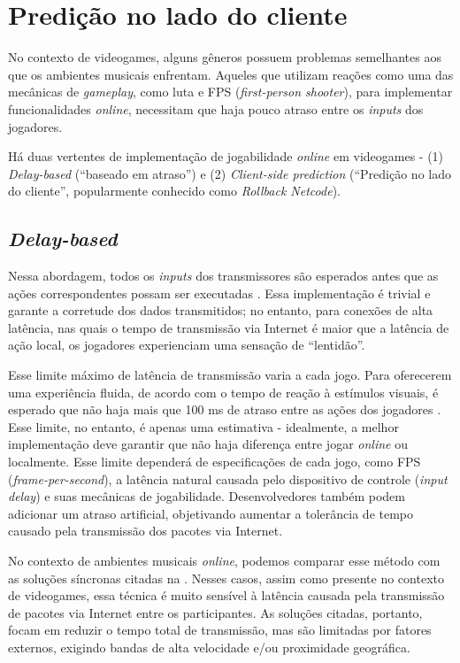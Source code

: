 \section{Predição no lado do cliente}
\label{sec:client_side_prediction}

No contexto de videogames, alguns gêneros possuem problemas semelhantes aos que os ambientes musicais enfrentam. Aqueles que utilizam reações como uma das mecânicas de \textit{gameplay}, como luta e FPS (\textit{first-person shooter}), para implementar funcionalidades \textit{online}, necessitam que haja pouco atraso entre os \textit{inputs} dos jogadores.

Há duas vertentes de implementação de jogabilidade \textit{online} em videogames - (1) \textit{Delay-based} (``baseado em atraso'')\cite{rollback} e (2) \textit{Client-side prediction} (``Predição no lado do cliente'', popularmente conhecido como \textit{Rollback Netcode})\cite{client-side-prediction}.

\subsection{\textit{Delay-based}}

Nessa abordagem, todos os \textit{inputs} dos transmissores são esperados antes que as ações correspondentes possam ser executadas \cite{rollback}. Essa implementação é trivial e garante a corretude dos dados transmitidos; no entanto, para conexões de alta latência, nas quais o tempo de transmissão via Internet é maior que a latência de ação local, os jogadores experienciam uma sensação de ``lentidão''.

Esse limite máximo de latência de transmissão varia a cada jogo. Para oferecerem uma experiência fluida, de acordo com o tempo de reação à estímulos visuais, é esperado que não haja mais que 100 ms de atraso entre as ações dos jogadores \cite{pubnub}. Esse limite, no entanto, é apenas uma estimativa - idealmente, a melhor implementação deve garantir que não haja diferença entre jogar \textit{online} ou localmente. Esse limite dependerá de especificações de cada jogo, como FPS (\textit{frame-per-second}), a latência natural causada pelo dispositivo de controle (\textit{input delay}) e suas mecânicas de jogabilidade. Desenvolvedores também podem adicionar um atraso artificial, objetivando aumentar a tolerância de tempo causado pela transmissão dos pacotes via Internet.

No contexto de ambientes musicais \textit{online}, podemos comparar esse método com as soluções síncronas citadas na . Nesses casos, assim como presente no contexto de videogames, essa técnica é muito sensível à latência causada pela transmissão de pacotes via Internet entre os participantes. As soluções citadas, portanto, focam em reduzir o tempo total de transmissão, mas são limitadas por fatores externos, exigindo bandas de alta velocidade e/ou proximidade geográfica.

